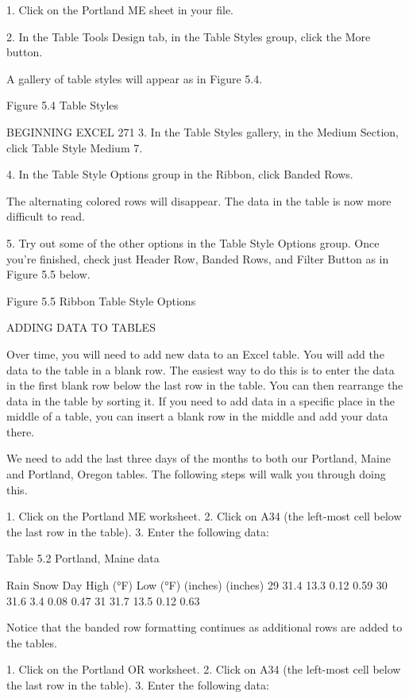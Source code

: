 1. Click on the Portland ME sheet in your file.

2. In the Table Tools Design tab, in the Table Styles group, click the More button.

A gallery of table styles will appear as in Figure 5.4.




Figure 5.4 Table Styles



BEGINNING EXCEL 271
3. In the Table Styles gallery, in the Medium Section, click Table Style Medium 7.

4. In the Table Style Options group in the Ribbon, click Banded Rows.

The alternating colored rows will disappear. The data in the table is now more difficult to read.

5. Try out some of the other options in the Table Style Options group. Once you’re finished, check
just Header Row, Banded Rows, and Filter Button as in Figure 5.5 below.




Figure 5.5 Ribbon Table Style Options


ADDING DATA TO TABLES

Over time, you will need to add new data to an Excel table. You will add the data to the table in a blank
row. The easiest way to do this is to enter the data in the first blank row below the last row in the
table. You can then rearrange the data in the table by sorting it. If you need to add data in a specific
place in the middle of a table, you can insert a blank row in the middle and add your data there.

We need to add the last three days of the months to both our Portland, Maine and Portland, Oregon
tables. The following steps will walk you through doing this.

1. Click on the Portland ME worksheet.
2. Click on A34 (the left-most cell below the last row in the table).
3. Enter the following data:

Table 5.2 Portland, Maine data

Rain     Snow
Day High (°F) Low (°F)
(inches) (inches)
29    31.4       13.3       0.12       0.59
30    31.6       3.4        0.08       0.47
31    31.7       13.5       0.12       0.63




Notice that the banded row formatting continues as additional rows are added to the tables.

1. Click on the Portland OR worksheet.
2. Click on A34 (the left-most cell below the last row in the table).
3. Enter the following data:

